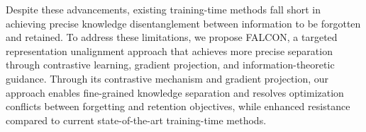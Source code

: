 Despite these advancements, existing training-time methods fall short in achieving precise knowledge disentanglement between information to be forgotten and retained. To address these limitations, we propose FALCON, a targeted representation unalignment approach that achieves more precise separation through contrastive learning, gradient projection, and information-theoretic guidance. Through its contrastive mechanism and gradient projection, our approach enables fine-grained knowledge separation and resolves optimization conflicts between forgetting and retention objectives, while enhanced resistance compared to current state-of-the-art training-time methods.



